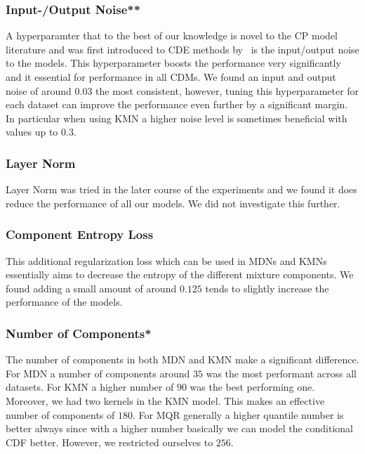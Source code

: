 \subsubsection{Input-/Output Noise**}

A hyperparamter that to the best of our knowledge is novel to the CP model literature and was first introduced to CDE methods by~\cite{rothfuss2019noise} is the input/output noise to the models. This hyperparameter boosts the performance very significantly and it essential for performance in all CDMs. We found an input and output noise of around $0.03$ the most consistent, however, tuning this hyperparameter for each dataset can improve the performance even further by a significant margin. In particular when using KMN a higher noise level is sometimes beneficial with values up to $0.3$.

\subsubsection{Layer Norm}

Layer Norm was tried in the later course of the experiments and we found it does reduce the performance of all our models. We did not investigate this further.

\subsubsection{Component Entropy Loss}

This additional regularization loss which can be used in MDNs and KMNs essentially aims to decrease the entropy of the different mixture components. We found adding a small amount of around $0.125$ tends to slightly increase the performance of the models.

\subsubsection{Number of Components*}

The number of components in both MDN and KMN make a significant difference. For MDN a number of components around $35$ was the most performant across all datasets. For KMN a higher number of $90$ was the best performing one. Moreover, we had two kernels in the KMN model. This makes an effective number of components of $180$. For MQR generally a higher quantile number is better always since with a higher number basically we can model the conditional CDF better. However, we restricted ourselves to $256$.

